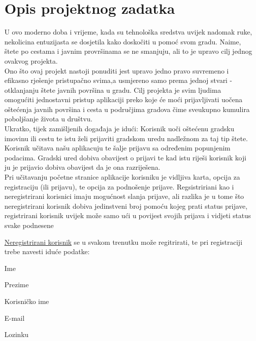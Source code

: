 \chapter{Opis projektnog zadatka}
		
		 U ovo moderno doba i vrijeme, kada su tehnološka sredstva uvijek nadomak ruke, nekolicina entuzijasta se dosjetila kako doskočiti u pomoć svom gradu. Naime, štete po cestama i javnim provršinama se ne smanjuju, ali to je upravo cilj jednog ovakvog projekta. \\
		
		 Ono što ovaj projekt nastoji ponuditi jest upravo jedno pravo suvremeno i efikasno rješenje pristupačno svima,a usmjereno samo prema jednoj stvari - otklanjanju štete javnih površina u gradu. Cilj projekta je svim ljudima omogućiti jednostavni pristup aplikaciji preko koje će moći prijavljivati uočena oštećenja javnih površina i cesta u područjima gradova čime sveukupno kumulira poboljšanje života u društvu.\\
		
		 Ukratko, tijek zamišljenih događaja je idući: Korisnik uoči oštećenu gradsku imovinu ili cestu te istu želi prijaviti gradskom uredu nadležnom za taj tip štete. Korisnik učitava našu aplikacuju te šalje prijavu sa određenim popunjenim podacima. Gradski ured dobiva obavijest o prijavi te kad istu riješi korisnik koji ju je prijavio dobiva obavijest da je ona razriješena. \\
		
		 Pri učitavanju početne stranice aplikacije korisniku je vidljiva karta, opcija za registraciju (ili prijavu), te opcija za podnošenje prijave. Regsistririani kao i neregistrirani korisnici imaju mogućnost slanja prijave, ali razlika je u tome što neregistrirani korisnik dobiva jedinstveni broj pomoću kojeg prati status prijave, registrirani korisnik uvijek može samo ući u povijest svojih prijava i vidjeti status svake podnesene
		
		 \underline{Neregistrirani korisnik} se u svakom trenutku može regitrirati, te pri registraciji trebe navesti iduće podatke:
		
		\begin{packed_item}
		\item Ime
		\item Prezime
		\item Korisničko ime
		\item E-mail
		\item Lozinku\\
		\end{packed_item}
		
